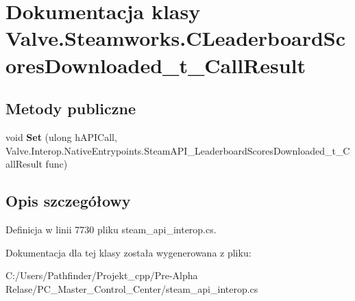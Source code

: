 \hypertarget{class_valve_1_1_steamworks_1_1_c_leaderboard_scores_downloaded__t___call_result}{}\section{Dokumentacja klasy Valve.\+Steamworks.\+C\+Leaderboard\+Scores\+Downloaded\+\_\+t\+\_\+\+Call\+Result}
\label{class_valve_1_1_steamworks_1_1_c_leaderboard_scores_downloaded__t___call_result}
\subsection*{Metody publiczne}
\begin{DoxyCompactItemize}
\item 
\mbox{\label{class_valve_1_1_steamworks_1_1_c_leaderboard_scores_downloaded__t___call_result_af7d4d38755b52113467a1c9af70e2347}} 
void {\bfseries Set} (ulong h\+A\+P\+I\+Call, Valve.\+Interop.\+Native\+Entrypoints.\+Steam\+A\+P\+I\+\_\+\+Leaderboard\+Scores\+Downloaded\+\_\+t\+\_\+\+Call\+Result func)
\end{DoxyCompactItemize}


\subsection{Opis szczegółowy}


Definicja w linii 7730 pliku steam\+\_\+api\+\_\+interop.\+cs.



Dokumentacja dla tej klasy została wygenerowana z pliku\+:\begin{DoxyCompactItemize}
\item 
C\+:/\+Users/\+Pathfinder/\+Projekt\+\_\+cpp/\+Pre-\/\+Alpha Relase/\+P\+C\+\_\+\+Master\+\_\+\+Control\+\_\+\+Center/steam\+\_\+api\+\_\+interop.\+cs\end{DoxyCompactItemize}
